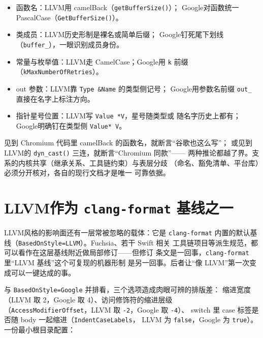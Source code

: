 \documentclass[12pt,a4paper,fontset=fandol]{ctexbook}
\newcommand{\Fn}[1]{\texttt{#1()}}
\newcommand{\Tp}[1]{\texttt{#1}}
\newcommand{\Bk}{\discretionary{}{}{}}
\newcommand{\Lang}[1]{\textsf{#1}}
\newcommand{\DomGo}{\Lang{Google}}
\newcommand{\DomLlvm}{\Lang{LLVM}}
\begin{document}
\begin{compare}[title={\DomLlvm 与 \DomGo 的命名差分}]
\begin{itemize}
  \item 函数名：\DomLlvm 用 camelBack（\Fn{get\allowbreak BufferSize}）；
        \DomGo 对函数统一 PascalCase（\Fn{GetBufferSize}）。
  \item 类成员：\DomLlvm 历史形制是裸名或简单后缀；
        \DomGo 钉死尾下划线（\Tp{buffer\_}），一眼识别成员身份。
  \item 常量与枚举值：\DomLlvm 走 CamelCase；\DomGo 用 \Tp{k} 前缀
        （\Tp{kMaxNumberOfRetries}）。
  \item out 参数：\DomLlvm 靠 \Tp{Type \&Name} 的类型侧记号；
        \DomGo 用参数名前缀 \Tp{out\_} 直接在名字上标注方向。
  \item 指针星号位置：\DomLlvm 写 \Tp{Value *V}，星号随类型或
        随名字历史上都有；\DomGo 明确钉在类型侧 \Tp{Value* V}。
\end{itemize}
\end{compare}

\begin{warning}[title={把支系当成内核来引用是常见误读}]
见到 Chromium 代码里 camelBack 的函数名，就断言``谷歌也这么写''；
或见到 \DomLlvm 的 \Fn{dyn\_{\Bk}cast} 三连，就断言``Chromium 同款''——
两种推论都越了界。支系的内核共享（继承关系、工具链约束）与表层分歧
（命名、豁免清单、平台库）必须分开核对，各自的现行文档才是唯一
可靠依据。
\end{warning}

\section{\DomLlvm 作为 \Tp{clang-format} 基线之一}
\label{sec:ch03-baseline}

\DomLlvm 风格的影响面还有一层常被忽略的载体：它是 \Tp{clang-format}
内置的默认基线（\Tp{BasedOnStyle=LLVM}）。Fuchsia、若干 Swift 相关
工具链项目等派生规范，都可以看作在这层基线附近做局部修订——但修订
条文是一回事，\Tp{clang-format} 里``LLVM 基线''这个可复现的机器形制
是另一回事。后者让``像 \DomLlvm''第一次变成可以一键达成的事。

与 \Tp{BasedOnStyle=Google} 并排看，三个选项造成肉眼可辨的排版差：
缩进宽度（LLVM 取 2，Google 取 4）、访问修饰符的缩进层级
（\Tp{Access\allowbreak Modifier\allowbreak Offset}，LLVM 取 \Tp{-2}，Google 取 \Tp{-4}）、
switch 里 case 标签是否随 body 一起缩进（\Tp{Indent\allowbreak CaseLabels}，
LLVM 为 \Tp{false}，Google 为 \Tp{true}）。一份最小根目录配置：
\end{document}
